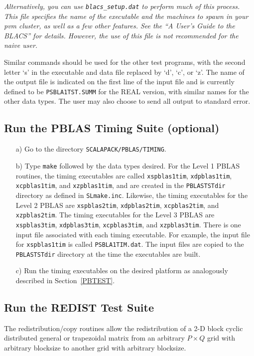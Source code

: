 \documentclass[11pt]{report}
\begin{document}
{\it Alternatively, you can use {\tt blacs\_setup.dat} to perform much of
this process.  This file specifies the name of
the executable and the machines to spawn in your pvm cluster, as well
as a few other features.  See the ``A User's Guide to the BLACS'' for details.
However, the use of this file is not recommended for the naive user.}

Similar commands should be used for the other test programs, with
the second letter `s' in the executable and data file
replaced by `d', `c', or `z'.
The name of the output file is indicated on the first line of the
input file and is currently defined to be {\tt PSBLA1TST.SUMM} for
the REAL version, with similar names for the other data types.  The
user may also choose to send all output to standard error.

\subsection{Run the PBLAS Timing Suite (optional)}
\label{PBTIME}

\begin{itemize}
\item[a)]
Go to the directory {\tt SCALAPACK/PBLAS/TIMING}.

\item[b)]
Type {\tt make} followed by the data types desired.  For the Level 1
PBLAS routines, the timing executables are called {\tt xspblas1tim},
{\tt xdpblas1tim}, {\tt xcpblas1tim}, and {\tt xzpblas1tim}, and are
created in the
{\tt PBLASTSTdir} directory as defined in {\tt SLmake.inc}.  Likewise,
the timing executables for the Level 2 PBLAS are {\tt xspblas2tim},
{\tt xdpblas2tim}, {\tt xcpblas2tim}, and {\tt xzpblas2tim}.  The
timing executables for the Level 3 PBLAS are {\tt xspblas3tim},
{\tt xdpblas3tim}, {\tt xcpblas3tim}, and {\tt xzpblas3tim}. There is
one input
file associated with each timing executable.  For example, the input
file for {\tt xspblas1tim} is called {\tt PSBLA1TIM.dat}.  The input files
are copied to the {\tt PBLASTSTdir} directory at the time the
executables are built.

\item[c)] Run the timing executables on the desired platform as
analogously described in Section~\ref{PBTEST}.
\end{itemize}

\subsection{Run the REDIST Test Suite}
\label{RDTEST}
The redistribution/copy routines allow the
redistribution of a 2-D block cyclic distributed general or trapezoidal
matrix from an arbitrary $P \times Q$ grid with arbitrary blocksize to
another grid with arbitrary
blocksize.
\end{document}
